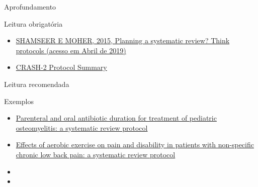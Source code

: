 \documentclass{beamer}
\begin{document}
\begin{frame}{Aprofundamento}
  \begin{block}{Leitura obrigatória}
    \scriptsize
    \begin{itemize}
    \item \href{http://blogs.biomedcentral.com/bmcblog/2015/01/05/planning-a-systematic-review-think-protocols/}
    {SHAMSEER E MOHER, 2015, Planning a systematic review? Think protocols (acesso em Abril de 2019)}
  \item \href{http://www.crash2.lshtm.ac.uk/SummaryEng.htm}{CRASH-2 Protocol Summary}
    \end{itemize}
  \end{block}
  \begin{block}{Leitura recomendada}
    \begin{exampleblock}{\tiny Exemplos}
      \begin{itemize}
        \tiny
      \item \href{https://doi.org/10.1186/2046-4053-2-92}
        {Parenteral and oral antibiotic duration for treatment of pediatric osteomyelitis: a systematic review protocol}
      \item \href{https://doi.org/10.1186/s13643-019-1019-3}
        {Effects of aerobic exercise on pain and disability in patients with non-specific chronic low back pain: a systematic review protocol}
      \end{itemize}
    \end{exampleblock}
    \begin{itemize}
      \tiny
    \item 
    \item 
  \end{itemize}

  \end{block}
\end{frame}
\end{document}
